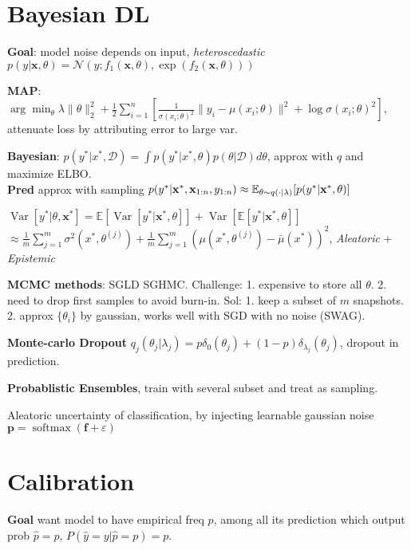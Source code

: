 \section{Bayesian DL}
\textbf{Goal}: model noise depends on input, \textit{heteroscedastic} $p(y | \mathbf{x}, \theta)=\mathcal{N}(y ; f_1(\mathbf{x}, \theta), \exp (f_2(\mathbf{x}, \theta)))$

\textbf{MAP}: $\arg \min _\theta \lambda\|\theta\|_2^2+\frac{1}{2} \sum_{i=1}^n[\frac{1}{\sigma(x_i ; \theta)^2}\|y_i-\mu(x_i ; \theta)\|^2+\log \sigma(x_i ; \theta)^2]$,  attenuate loss by attributing error to large var.

\textbf{Bayesian}: $p(y^* | x^*,\mathcal{D})=\int p(y^* | x^*, \theta) p(\theta | \mathcal{D}) d \theta$, approx with $q$ and maximize ELBO. \\
\textbf{Pred} approx with sampling $p(y^* | \mathbf{x}^*, \mathbf{x}_{1: n}, y_{1: n}) \approx \mathbb{E}_{\theta {\small \sim} q(\cdot | \lambda)}[p(y^* | \mathbf{x}^*, \theta)]$ 

$\operatorname{Var}[y^* | \theta, \mathbf{x}^*]=\mathbb{E}[\operatorname{Var}[y^* | \mathbf{x}^*, \theta]]+\operatorname{Var}[\mathbb{E}[y^* | \mathbf{x}^*, \theta]]$ $\approx \frac{1}{m} \sum_{j=1}^m \sigma^2(x^*, \theta^{(j)})+\frac{1}{m} \sum_{j=1}^m(\mu(x^*, \theta^{(j)})-\bar{\mu}(x^*))^2$, \textit{Aleatoric} + \textit{Epistemic}

\textbf{MCMC methods}: SGLD SGHMC. Challenge: 1. expensive to store all $\theta$. 2. need to drop first samples to avoid burn-in. Sol: 1. keep a subset of $m$ snapshots. 2. approx $\{\theta_i\}$ by gaussian, works well with SGD with no noise (SWAG).

\textbf{Monte-carlo Dropout} $q_j(\theta_j | \lambda_j)=p \delta_0(\theta_j)+(1-p) \delta_{\lambda_j}(\theta_j)$, dropout in prediction.

\textbf{Probablistic Ensembles}, train with several subset and treat as sampling.

Aleatoric uncertainty of classification, by injecting learnable gaussian noise $\mathbf{p}=\operatorname{softmax}(\mathbf{f}+\varepsilon)$

\section{Calibration}

\textbf{Goal} want model to have empirical freq $p$, among all its prediction which output prob $\hat{p}=p$, $P(\hat{y}=y|\hat{p}=p)=p$.

